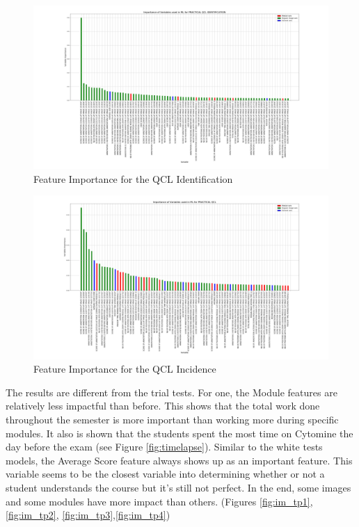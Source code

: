 \documentclass[a4paper,11pt]{report}
\numberwithin{figure}{section} %
\begin{document}
      \begin{figure}[H]
      \centering
      \includegraphics[width=.95\linewidth]{plots/var_importance_PRACTICAL_QCL_IDENTIFICATION_2018-04-29_14_34_11.png}
      \caption{Feature Importance for the QCL Identification}
      \label{fig:var_tp3}
      \end{figure}

      \begin{figure}[H]
      \centering
      \includegraphics[width=.95\linewidth]{plots/var_importance_PRACTICAL_QCL_2018-04-29_14_33_44.png}
      \caption{Feature Importance for the QCL Incidence}
      \label{fig:var_tp4}
      \end{figure}

The results are different from the trial tests.
For one, the Module features are relatively less impactful than before.
This shows that the total work done throughout the semester is more important than working more during specific modules.
It also is shown that the students spent the most time on Cytomine the day before the exam (see Figure \ref{fig:timelapse}).
Similar to the white tests models, the Average Score feature always shows up as an important feature.
This variable seems to be the closest variable into determining whether or not a student understands the course but it's still not perfect.
In the end, some images and some modules have more impact than others.  (Figures \ref{fig:im_tp1}, \ref{fig:im_tp2}, \ref{fig:im_tp3},\ref{fig:im_tp4})
\end{document}
